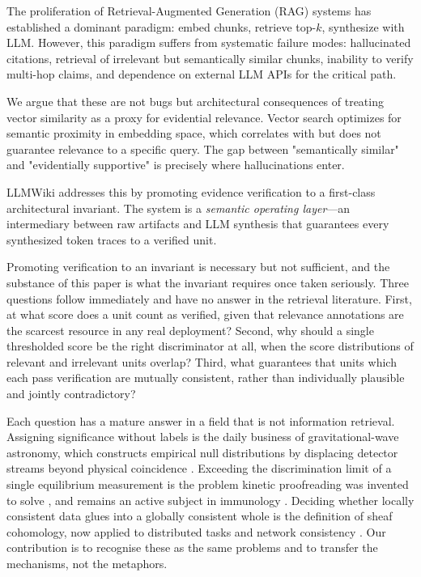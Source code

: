 The proliferation of Retrieval-Augmented Generation (RAG) systems has established a dominant paradigm: embed chunks, retrieve top-$k$, synthesize with LLM. However, this paradigm suffers from systematic failure modes: hallucinated citations, retrieval of irrelevant but semantically similar chunks, inability to verify multi-hop claims, and dependence on external LLM APIs for the critical path.

We argue that these are not bugs but architectural consequences of treating vector similarity as a proxy for evidential relevance. Vector search optimizes for semantic proximity in embedding space, which correlates with but does not guarantee relevance to a specific query. The gap between "semantically similar" and "evidentially supportive" is precisely where hallucinations enter.

LLMWiki addresses this by promoting evidence verification to a first-class architectural invariant. The system is a \emph{semantic operating layer}---an intermediary between raw artifacts and LLM synthesis that guarantees every synthesized token traces to a verified unit.

Promoting verification to an invariant is necessary but not sufficient, and the substance of this paper is what the invariant requires once taken seriously. Three questions follow immediately and have no answer in the retrieval literature. First, at what score does a unit count as verified, given that relevance annotations are the scarcest resource in any real deployment? Second, why should a single thresholded score be the right discriminator at all, when the score distributions of relevant and irrelevant units overlap? Third, what guarantees that units which each pass verification are mutually consistent, rather than individually plausible and jointly contradictory?

Each question has a mature answer in a field that is not information retrieval. Assigning significance without labels is the daily business of gravitational-wave astronomy, which constructs empirical null distributions by displacing detector streams beyond physical coincidence \citep{was2010timeslides}. Exceeding the discrimination limit of a single equilibrium measurement is the problem kinetic proofreading was invented to solve \citep{hopfield1974kinetic,ninio1975kinetic}, and remains an active subject in immunology \citep{kirby2025parallel,multimolecular2026}. Deciding whether locally consistent data glues into a globally consistent whole is the definition of sheaf cohomology, now applied to distributed tasks and network consistency \citep{sheafdistributed2025,sheafnetworks2025}. Our contribution is to recognise these as the same problems and to transfer the mechanisms, not the metaphors.

